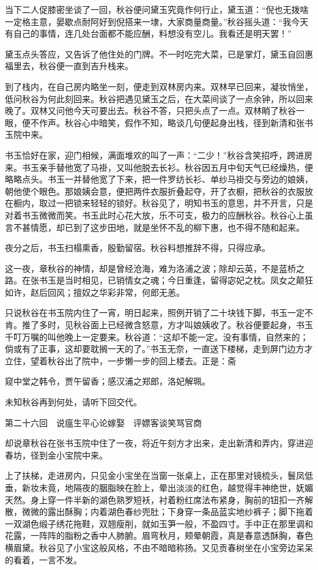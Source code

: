 \documentclass[12pt,UTF8]{ctexbook}
\begin{document}
{{{当下二人促膝密坐谈了一回，秋谷便问黛玉究竟作何行止，黛玉道：“倪也无拨啥一定格主意，晏歇点耐阿好到倪搭来一埭，大家商量商量。”秋谷摇头道：“我今天有自己的事情，连几处台面都不能应酬，料想没有空儿。我看还是明天罢！”

黛玉点头答应，又告诉了他住处的门牌。不一时吃完大菜，已是掌灯，黛玉自回惠福里去，秋谷便一直到吉升栈来。

到了栈内，在自己房内略坐一刻，便走到双林房内来。双林早已回来，凝妆悄坐，低问秋谷为何此刻回来。秋谷把遇见黛玉之后，在大菜间谈了一点余钟，所以回来晚了。双林又问他今天可要出去。秋谷不答，只把头点了一点。双林睄了秋谷一眼，便不作声。秋谷心中暗笑，假作不知，略谈几句便起身出栈，径到新清和张书玉院中来。

书玉恰好在家，迎门相候，满面堆欢的叫了一声：“二少！”秋谷含笑招呼，跨进房来。书玉亲手替他宽了马褂，又叫他脱去长衫。秋谷因五月中旬天气已经燥热，便略略点头。书玉一并替他宽了下来，把一件罗纺长衫、单纱马褂交与旁边的娘姨，朝他使个眼色。那娘姨会意，便把两件衣服折叠起夺，开了衣橱，把秋谷的衣服放在橱内，取过一把锁来轻轻的锁好。秋谷见了，明知书玉的意思，并不开言，只是对着书玉微微而笑。书玉此时心花大放，乐不可支，极力的应酬秋谷。秋谷心上虽言不甚情愿，却已到了这步田地，就是坐怀不乱的柳下惠，也不得不随和起来。

夜分之后，书玉扫榻熏香，殷勤留宿。秋谷料想推辞不得，只得应承。

这一夜，章秋谷的神情，却是曾经沧海，难为洛浦之波；除却云英，不是蓝桥之路。在张书玉是当时相见，已销情女之魂；今日重逢，留得宓妃之枕。凤女之颠狂如许，赵后回风；擅奴之华彩非常，何郎无恙。

只说秋谷在书玉院内住了一宵，明日起来，照例开销了二十块钱下脚，书玉一定不肯。推了多时，见秋谷面上已经微含怒意，方才叫娘姨收了。秋谷便要起身，书玉千叮万嘱的叫他晚上一定要来。秋谷道：“这却不能一定。没有事情，自然来的；倘或有了正事，这却要耽搁一天的了。”书玉无奈，一直送下楼梯，走到屏门边方才立住，望着秋谷出了院中，一步懒一步的回上楼去。正是：斋

窥中堂之韩令，贾午留香；感汉浦之郑郎，洛妃解珮。

未知秋谷再到何处，请听下回交代。





第二十六回　说瘟生平心论嫁娶　评嫖客谈笑骂官商





却说章秋谷在张书玉院中住了一夜，将近午刻方才出来，走出新清和弄内，穿进迎春坊，径到金小宝院中来。

上了扶梯，走进房内，只见金小宝坐在当窗一张桌上，正在那里对镜梳头，鬟凤低垂，新妆未竟，地隔夜的胭脂映在脸上，晕出淡淡的红色，越觉得丰神绝世，妩媚天然。身上穿一件半新的湖色熟罗短袄，衬着粉红席法布紧身，胸前的钮扣一齐解散，微微的露出酥胸；内着湖色春纱兜肚；下身穿一条品蓝实地纱裤子；脚下拖着一双湖色缎子绣花拖鞋，双翘瘦削，就如玉笋一般，不盈四寸。手中正在那里调和花露，一阵阵的脂粉之香中人肺腑。眉弯秋月，颊晕朝霞，真是春意透酥胸，春色横眉黛。秋谷见了小宝这般风格，不由不暗暗称扬。又见贡春树坐在小宝旁边呆呆的看着，一言不发。

}}}
\end{document}
